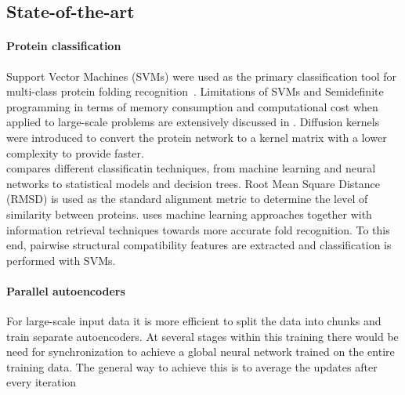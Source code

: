 \documentclass{article}
\begin{document}
\subsection{State-of-the-art}
\paragraph{Protein classification}
Support Vector Machines (SVMs) were used as the primary classification tool for multi-class protein folding recognition~\cite{ding2001multi}. Limitations of SVMs and Semidefinite programming in terms of memory consumption and computational cost when applied to large-scale problems are extensively discussed in \cite{tsuda2005fast}. Diffusion kernels were introduced to convert the protein network to a kernel matrix with a lower complexity to provide faster.\\

\cite{tsuda2005fast} compares different classificatin techniques, from machine learning and neural networks to statistical models and decision trees. Root Mean Square Distance (RMSD) is used as the standard alignment metric  to determine the level of similarity between proteins\cite{carugo2001normalized}. \cite{cheng2006machine} uses machine learning approaches together with information retrieval techniques towards more accurate fold recognition. To this end, pairwise structural compatibility features are extracted and classification is performed with SVMs.\\

\paragraph{Parallel autoencoders}

For large-scale input data it is more efficient to split the data into chunks and train separate autoencoders. At several stages within this training there would be need for synchronization to achieve a global neural network trained on the entire training data. The general way to achieve this is to average the updates after every iteration \cite{hinton1994autoencoders}
\end{document}
